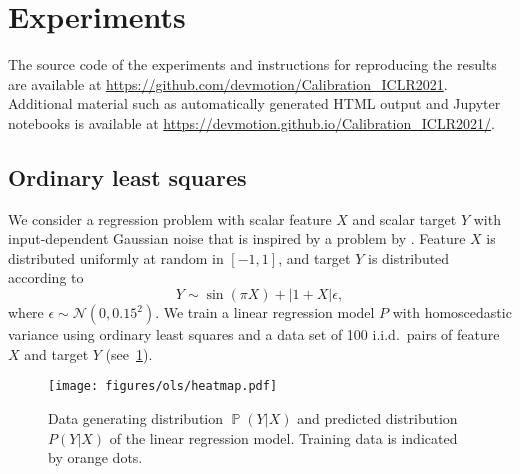 \documentclass{article}
\DeclareMathOperator{\Prob}{\mathbb{P}}
\begin{document}



\clearpage

\appendix
{}
\renewcommand*{\thetheorem}{\thesection.\arabic{theorem}}
\renewcommand*{\thelemma}{\thesection.\arabic{lemma}}
\renewcommand*{\theproposition}{\thesection.\arabic{proposition}}
\renewcommand*{\thecorollary}{\thesection.\arabic{corollary}}
\renewcommand*{\thedefinition}{\thesection.\arabic{definition}}
\renewcommand*{\theexample}{\thesection.\arabic{example}}
\renewcommand*{\theremark}{\thesection.\arabic{remark}}
\makeatletter
{}
\makeatother

\section{Experiments}
\label{app:experiments}

The source code of the experiments and instructions for reproducing the
results are available at
\url{https://github.com/devmotion/Calibration_ICLR2021}. Additional
material such as automatically generated HTML output and Jupyter
notebooks is available at
\url{https://devmotion.github.io/Calibration_ICLR2021/}.

\subsection{Ordinary least squares}\label{app:ols}

We consider a regression problem with scalar feature $X$ and scalar target $Y$ with input-dependent Gaussian noise
that is inspired by a problem by \citet{Gustafsson2019}. Feature $X$ is
distributed uniformly at random in $[-1, 1]$, and target $Y$ is distributed according to
\begin{equation*}
    Y \sim \sin(\pi X) + | 1 + X | \epsilon,
\end{equation*}
where $\epsilon \sim \mathcal{N}(0, 0.15^2)$. We train a linear regression model $P$ with
homoscedastic variance using ordinary least squares and a data set of 100 i.i.d.\
pairs of feature $X$ and target $Y$ (see~\cref{fig:ols_heatmap}).

\begin{figure}[hpt]
    \begin{center}
        \texttt{[image: figures/ols/heatmap.pdf]}
        \caption{Data generating distribution $\Prob(Y|X)$ and predicted distribution $P(Y|X)$ of the linear regression model.
        Training data is indicated by orange dots.}
        \label{fig:ols_heatmap}
    \end{center}
\end{figure}
\end{document}
